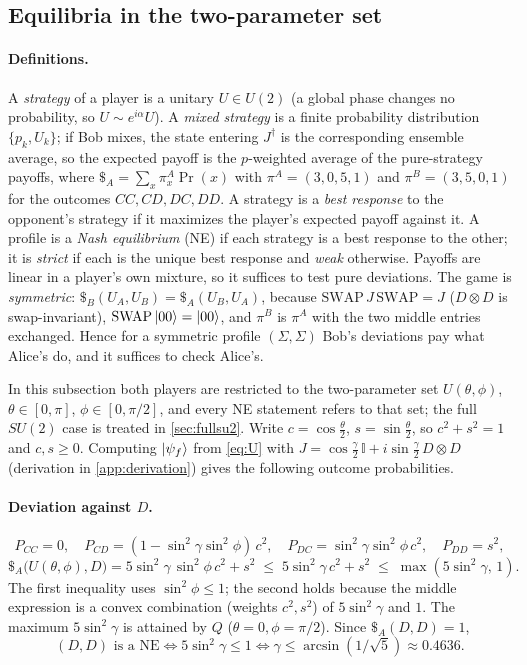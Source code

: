 \documentclass[11pt,a4paper]{article}
\begin{document}
\subsection{Equilibria in the two-parameter set}\label{sec:equilibria}
\paragraph{Definitions.} A \emph{strategy} of a player is a unitary $U\in U(2)$ (a global phase changes no probability, so $U\sim e^{i\alpha}U$). A \emph{mixed strategy} is a finite probability distribution $\{p_k,U_k\}$; if Bob mixes, the state entering $J^\dagger$ is the corresponding ensemble average, so the expected payoff is the $p$-weighted average of the pure-strategy payoffs, where $\$_A=\sum_x\pi^A_x\Pr(x)$ with $\pi^A=(3,0,5,1)$ and $\pi^B=(3,5,0,1)$ for the outcomes $CC,CD,DC,DD$. A strategy is a \emph{best response} to the opponent's strategy if it maximizes the player's expected payoff against it. A profile is a \emph{Nash equilibrium} (NE) if each strategy is a best response to the other; it is \emph{strict} if each is the unique best response and \emph{weak} otherwise. Payoffs are linear in a player's own mixture, so it suffices to test pure deviations. The game is \emph{symmetric}: $\$_B(U_A,U_B)=\$_A(U_B,U_A)$, because $\mathrm{SWAP}\,J\,\mathrm{SWAP}=J$ ($D\otimes D$ is swap-invariant), $\mathrm{SWAP}\ket{00}=\ket{00}$, and $\pi^B$ is $\pi^A$ with the two middle entries exchanged. Hence for a symmetric profile $(\Sigma,\Sigma)$ Bob's deviations pay what Alice's do, and it suffices to check Alice's.

In this subsection both players are restricted to the two-parameter set $U(\theta,\phi)$, $\theta\in[0,\pi]$, $\phi\in[0,\pi/2]$, and every NE statement refers to that set; the full $SU(2)$ case is treated in \cref{sec:fullsu2}. Write $c=\cos\frac\theta2$, $s=\sin\frac\theta2$, so $c^2+s^2=1$ and $c,s\ge0$. Computing $\ket{\psi_f}$ from \cref{eq:U} with $J=\cos\frac\gamma2\,\mathbb{I}+i\sin\frac\gamma2\,D\otimes D$ (derivation in \cref{app:derivation}) gives the following outcome probabilities.

\paragraph{Deviation against $D$.}
\[
P_{CC}=0,\quad P_{CD}=(1-\sin^2\gamma\sin^2\phi)\,c^2,\quad P_{DC}=\sin^2\gamma\sin^2\phi\,c^2,\quad P_{DD}=s^2,
\]
\begin{equation}
\$_A\big(U(\theta,\phi),D\big)=5\sin^2\gamma\,\sin^2\phi\,c^2+s^2\;\le\;5\sin^2\gamma\,c^2+s^2\;\le\;\max(5\sin^2\gamma,\,1).\label{eq:devD}
\end{equation}
The first inequality uses $\sin^2\phi\le1$; the second holds because the middle expression is a convex combination (weights $c^2,s^2$) of $5\sin^2\gamma$ and $1$. The maximum $5\sin^2\gamma$ is attained by $Q$ ($\theta=0,\phi=\pi/2$). Since $\$_A(D,D)=1$,
\[
(D,D)\text{ is a NE}\iff 5\sin^2\gamma\le1\iff\gamma\le\arcsin(1/\sqrt5)\approx0.4636 .
\]
\end{document}
